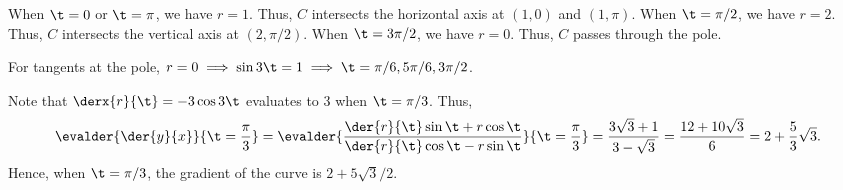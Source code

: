 \begin{solution}
\begin{ppart}
        When $\t = 0$ or $\t = \pi$, we have $r = 1$. Thus, $C$ intersects the horizontal axis at $(1, 0)$ and $(1, \pi)$. When $\t = \pi/2$, we have $r = 2$. Thus, $C$ intersects the vertical axis at $(2, \pi/2)$. When $\t = 3\pi/2$, we have $r = 0$. Thus, $C$ passes through the pole.

        For tangents at the pole, $r = 0 \implies \sin 3\t = 1 \implies \t = \pi/6, 5\pi/6, 3\pi/2$.
    \end{ppart}
    \begin{ppart}
        Note that $\derx{r}{\t} = -3\cos3\t$ evaluates to 3 when $\t = \pi/3$. Thus, \[\evalder{\der{y}{x}}{\t = \frac\pi3} = \evalder{\frac{\der{r}{\t}\sin\t + r\cos\t}{\der{r}{\t}\cos\t - r\sin\t}}{\t = \frac\pi3} = \frac{3\sqrt3 + 1}{3 - \sqrt3} = \frac{12 + 10\sqrt3}{6} = 2 + \frac{5}{3} \sqrt3.\] Hence, when $\t = \pi/3$, the gradient of the curve is $2 + 5\sqrt3/2$.
    \end{ppart}
\end{solution}
